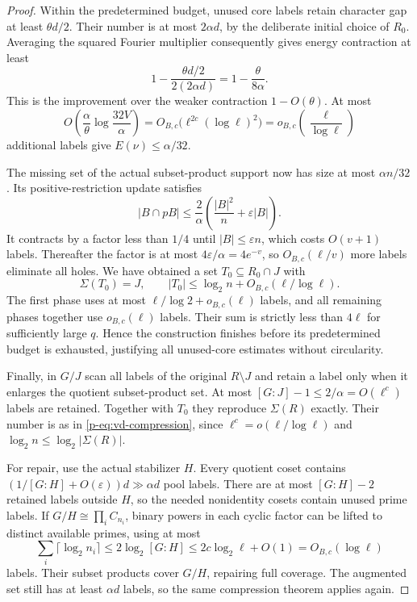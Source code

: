 \documentclass[11pt,a4paper]{article}
\theoremstyle{definition}
\theoremstyle{remark}
\begin{document}
\begin{proof}
Within the predetermined budget, unused core labels retain character
gap at least $\theta d/2$.
Their number is at most $2\alpha d$, by the deliberate initial
choice of $R_0$. Averaging the squared Fourier multiplier consequently
gives energy contraction at least
\[
 1-\frac{\theta d/2}{2(2\alpha d)}
 =1-\frac{\theta}{8\alpha}.
\]
This is the improvement over the weaker contraction $1-O(\theta)$.
At most
\[
 O\left(\frac{\alpha}{\theta}
               \log\frac{32V}{\alpha}\right)
 =O_{B,c}\bigl(\ell^{2c}(\log\ell)^2\bigr)
 =o_{B,c}\left(\frac\ell{\log\ell}\right)
\]
additional labels give $E(\nu)\leq\alpha/32$.

The missing set of the actual subset-product support now has size
at most $\alpha n/32$. Its positive-restriction update satisfies
\[
 |B\cap pB|\leq\frac2\alpha
       \left(\frac{|B|^2}{n}+\varepsilon|B|\right).
\]
It contracts by a factor less than $1/4$ until $|B|\leq\varepsilon n$,
which costs $O(v+1)$ labels. Thereafter the factor is at most
$4\varepsilon/\alpha=4e^{-v}$, so
$O_{B,c}(\ell/v)$ more labels eliminate all holes.
We have obtained a set $T_0\subseteq R_0\cap J$ with
\[
 \Sigma(T_0)=J,
 \qquad |T_0|\leq\log_2n+
 O_{B,c}(\ell/\log\ell).
\]
The first phase uses at most $\ell/\log2+o_{B,c}(\ell)$ labels, and
all remaining phases together use $o_{B,c}(\ell)$ labels. Their sum
is strictly less than $4\ell$ for sufficiently large $q$. Hence the
construction finishes before its predetermined budget is exhausted,
justifying all unused-core estimates without circularity.

Finally, in $G/J$ scan all labels of the original $R\setminus J$ and
retain a label only when it enlarges the quotient subset-product set.
At most $[G:J]-1\leq2/\alpha=O(\ell^c)$ labels are retained.
Together with $T_0$ they reproduce $\Sigma(R)$ exactly. Their number
is as in \eqref{p-eq:vd-compression}, since
$\ell^c=o(\ell/\log\ell)$ and
$\log_2n\leq\log_2|\Sigma(R)|$.

For repair, use the actual stabilizer $H$. Every quotient coset
contains $(1/[G:H]+O(\varepsilon))d\gg\alpha d$ pool labels.
There are at most $[G:H]-2$ retained labels outside $H$, so the needed
nonidentity cosets contain unused prime labels. If
$G/H\cong\prod_i C_{n_i}$, binary powers in each cyclic factor can be
lifted to distinct available primes, using at most
\[
 \sum_i\lceil\log_2n_i\rceil
 \leq2\log_2[G:H]
 \leq2c\log_2\ell+O(1)=O_{B,c}(\log\ell)
\]
labels. Their subset products cover $G/H$, repairing full coverage.
The augmented set still has at least $\alpha d$ labels, so the same
compression theorem applies again.
\end{proof}
\end{document}
